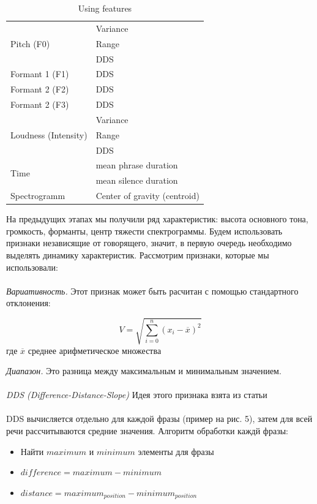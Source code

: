 \documentclass[14pt]{extarticle}
\begin{document}
\begin{table}

\begin{tabular}{|p{2.2in}|p{2.2in}|} 
\hline
\multirow{3}{*}{Pitch (F0) }& Variance \\ \cline{2-2}
													& Range \\ \cline{2-2} 
													& DDS \\ \hline 
Formant 1 (F1) & DDS \\ \hline 
Formant 2 (F2) & DDS \\ \hline 
Formant 2 (F3) & DDS \\ \hline 
\multirow{3}{*}{Loudness (Intensity) } & Variance \\ \cline{2-2}
																		& Range \\ \cline{2-2}
																		& DDS \\ \hline 
\multirow{2}{*}{Time} & mean phrase duration \\ \cline{2-2} 
 & mean silence duration \\ \hline 
Spectrogramm & Center of gravity (centroid) \\ \hline 
\end{tabular}
	\caption{Using features}
	\label{Using features}
\end{table}

На предыдущих этапах мы получили ряд характеристик: высота основного тона, громкость, форманты, центр тяжести спектрограммы. Будем использовать признаки независящие от говорящего, значит, в первую очередь необходимо выделять динамику характеристик. Рассмотрим признаки, которые мы использовали: \\ \\
\emph{Вариативность.} Этот признак может быть расчитан с помощью стандартного отклонения:
\begin{center}
\[V=\sqrt{
\sum_{i=0}^{n}{
               (x_i-\overline{x})^2
               }
}
\]
 где  $\overline{x}$ среднее арифметическое множества \\
\end{center}
\emph{Диапазон.} Это разница между максимальным и минимальным значением.
\\\\
\emph{DDS (Difference-Distance-Slope)} Идея этого признака взята из статьи\\ \cite{brittaelizabet} \\ DDS вычисляется отдельно для каждой фразы (пример на рис. 5), затем для всей речи рассчитываются средние значения. Алгоритм обработки каждй фразы:
\begin{itemize}
	\item Найти $maximum$ и $minimum$ элементы для фразы
	\item $difference=maximum-minimum$
	\item $distance=maximum_{position}-minimum_{position}$
\end{itemize}
\end{document}

